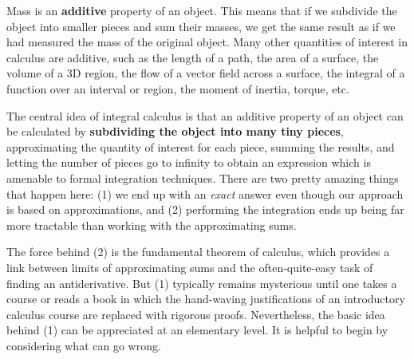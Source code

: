 \documentclass{watsonbook}
\begin{document}
  Mass is an \textbf{additive} property of an object. This means that if
  we subdivide the object into smaller pieces and sum their masses, we
  get the same result as if we had measured the mass of the original
  object. Many other quantities of interest in calculus are additive,
  such as the length of a path, the area of a surface, the volume of a
  3D region, the flow of a vector field across a surface, the integral
  of a function over an interval or region, the moment of inertia,
  torque, etc.
  
  The central idea of integral calculus is that an additive property of
  an object can be calculated by \textbf{subdividing the object into
    many tiny pieces}, approximating the quantity of interest for each
  piece, summing the results, and letting the number of pieces go to
  infinity to obtain an expression which is amenable to formal
  integration techniques. There are two pretty amazing things that
  happen here: (1) we end up with an \textit{exact} answer even though
  our approach is based on approximations, and (2) performing the
  integration ends up being far more tractable than working with the
  approximating sums.
  
  The force behind (2) is the fundamental theorem of calculus, which
  provides a link between limits of approximating sums and the
  often-quite-easy task of finding an antiderivative. But (1) typically
  remains mysterious until one takes a course or reads a book in
  which the hand-waving justifications of an introductory calculus course
  are replaced with rigorous proofs. Nevertheless, the basic idea behind
  (1) can be appreciated at an elementary level. It is helpful to begin
  by considering what can go wrong. 
  
\end{document}
